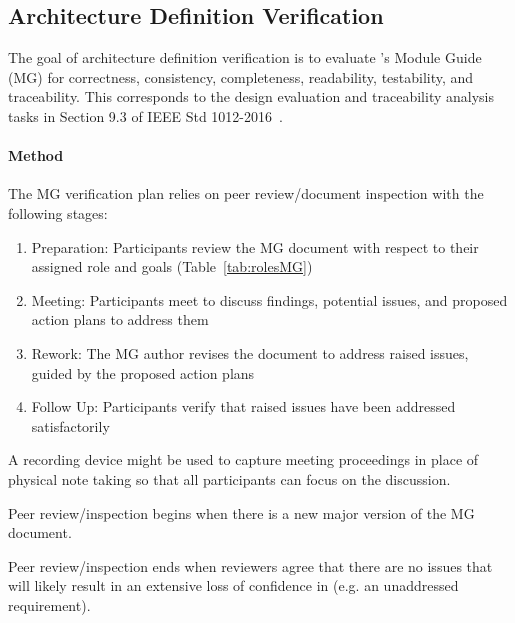 \subsection{Architecture Definition Verification}\label{sec:archVV}
The goal of architecture definition verification is to evaluate \progname{}'s
Module Guide (MG) for correctness, consistency, completeness, readability,
testability, and traceability. This corresponds to the design evaluation and
traceability analysis tasks in Section 9.3 of IEEE Std 1012-2016~\citep{vvIEEE}.

\paragraph{Method} The MG verification plan relies on peer review/document
inspection with the following stages:
\begin{enumerate}

    \item Preparation: Participants review the MG document with respect to
    their assigned role and goals (Table~\ref{tab:rolesMG})

    \item Meeting: Participants meet to discuss findings, potential issues, and
    proposed action plans to address them

    \item Rework: The MG author revises the document to address raised issues,
    guided by the proposed action plans

    \item Follow Up: Participants verify that raised issues have been addressed
    satisfactorily

\end{enumerate}

A recording device might be used to capture meeting proceedings in place of
physical note taking so that all participants can focus on the discussion.

Peer review/inspection begins when there is a new major version of the MG
document.

Peer review/inspection ends when reviewers agree that there are no issues that
will likely result in an extensive loss of confidence in \progname{} (e.g. an
unaddressed requirement).

